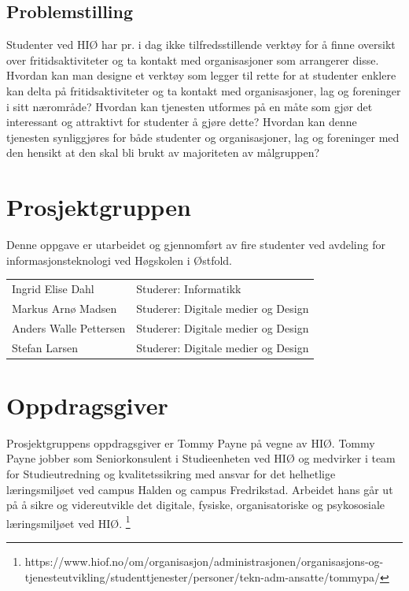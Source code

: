 \subsection{Problemstilling}
Studenter ved HIØ har pr. i dag ikke tilfredsstillende verktøy for å finne oversikt over fritidsaktiviteter og ta kontakt med organisasjoner som arrangerer disse. Hvordan kan man designe et verktøy som legger til rette for at studenter enklere kan delta på fritidsaktiviteter og ta kontakt med organisasjoner, lag og foreninger i sitt nærområde? Hvordan kan tjenesten utformes på en måte som gjør det interessant og attraktivt for studenter å gjøre dette? Hvordan kan denne tjenesten synliggjøres for både studenter og organisasjoner, lag og foreninger med den hensikt at den skal bli brukt av majoriteten av målgruppen?

\section{Prosjektgruppen}
Denne oppgave er utarbeidet og gjennomført av fire studenter ved avdeling for informasjonsteknologi ved Høgskolen i Østfold.

\begin{center}
\begin{tabular}{ l l }
 Ingrid Elise Dahl & Studerer: Informatikk \\ 
 Markus Arnø Madsen & Studerer: Digitale medier og Design \\  
 Anders Walle Pettersen & Studerer: Digitale medier og Design \\
 Stefan Larsen & Studerer: Digitale medier og Design \\
\end{tabular}
\end{center}

\section{Oppdragsgiver}
Prosjektgruppens oppdragsgiver er Tommy Payne på vegne av HIØ. Tommy Payne jobber som Seniorkonsulent i Studieenheten ved HIØ og medvirker i team for Studieutredning og kvalitetssikring med ansvar for det helhetlige læringsmiljøet ved campus Halden og campus Fredrikstad. Arbeidet hans går ut på å sikre og videreutvikle det digitale, fysiske, organisatoriske og psykososiale læringsmiljøet ved HIØ. \footnote{https://www.hiof.no/om/organisasjon/administrasjonen/organisasjons-og-tjenesteutvikling/studenttjenester/personer/tekn-adm-ansatte/tommypa/}

